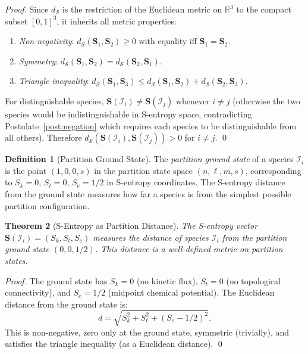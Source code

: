 \documentclass[11pt,twocolumn]{article}
\theoremstyle{plain}
\newtheorem{theorem}{Theorem}[section]
\theoremstyle{definition}
\newtheorem{definition}[theorem]{Definition}
\newcommand{\Sk}{S_k}
\newcommand{\St}{S_t}
\newcommand{\Se}{S_e}
\newcommand{\bS}{\mathbf{S}}
\newcommand{\dS}{d_{\mathcal{S}}}
\newcommand{\reals}{\mathbb{R}}
\begin{document}
\begin{proof}
Since $\dS$ is the restriction of the Euclidean metric on $\reals^3$ to the
compact subset $[0,1]^3$, it inherits all metric properties:
\begin{enumerate}[label=(\alph*)]
\item \emph{Non-negativity}: $\dS(\bS_1, \bS_2) \geq 0$ with equality iff
  $\bS_1 = \bS_2$.
\item \emph{Symmetry}: $\dS(\bS_1, \bS_2) = \dS(\bS_2, \bS_1)$.
\item \emph{Triangle inequality}: $\dS(\bS_1, \bS_3) \leq \dS(\bS_1, \bS_2)
  + \dS(\bS_2, \bS_3)$.
\end{enumerate}
For distinguishable species, $\bS(\mathcal{I}_i) \neq \bS(\mathcal{I}_j)$
whenever $i \neq j$ (otherwise the two species would be indistinguishable in
S-entropy space, contradicting Postulate~\ref{post:negation} which requires
each species to be distinguishable from all others). Therefore
$\dS(\bS(\mathcal{I}_i), \bS(\mathcal{I}_j)) > 0$ for $i \neq j$. \qed
\end{proof}

\begin{definition}[Partition Ground State]
\label{def:ground_state}
The \emph{partition ground state} of a species $\mathcal{I}_i$ is the point
$(1, 0, 0, s)$ in the partition state space $(n, \ell, m, s)$, corresponding to
$\Sk = 0$, $\St = 0$, $\Se = 1/2$ in S-entropy coordinates. The S-entropy
distance from the ground state measures how far a species is from the simplest
possible partition configuration.
\end{definition}

\begin{theorem}[S-Entropy as Partition Distance]
\label{thm:partition_distance}
The S-entropy vector $\bS(\mathcal{I}_i) = (\Sk, \St, \Se)$ measures the
distance of species $\mathcal{I}_i$ from the partition ground state
$(0, 0, 1/2)$. This distance is a well-defined metric on partition states.
\end{theorem}

\begin{proof}
The ground state has $\Sk = 0$ (no kinetic flux), $\St = 0$ (no topological
connectivity), and $\Se = 1/2$ (midpoint chemical potential). The Euclidean
distance from the ground state is:
\[
  d = \sqrt{\Sk^2 + \St^2 + (\Se - 1/2)^2}.
\]
This is non-negative, zero only at the ground state, symmetric (trivially), and
satisfies the triangle inequality (as a Euclidean distance). \qed
\end{proof}
\end{document}
